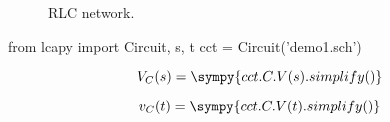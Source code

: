 \documentclass[a4paper, 12pt]{article}
\begin{document}
\begin{figure}
  \centering
  
  \caption{RLC network.}
\end{figure}

\begin{sympysilent}
  from lcapy import Circuit, s, t
  cct = Circuit('demo1.sch')
\end{sympysilent}

\begin{equation}
  V_C(s) = \sympy{cct.C.V(s).simplify()}
\end{equation}

\begin{equation}
  v_C(t) = \sympy{cct.C.V(t).simplify()}
\end{equation}
\end{document}
